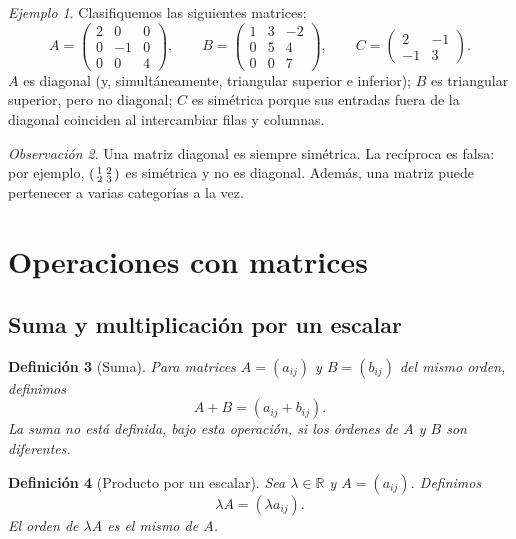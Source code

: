 \documentclass[12pt]{article}
\newtheorem{definicion}{Definición}[section]
\theoremstyle{remark}
\newtheorem{observacion}[definicion]{Observación}
\newtheorem{ejemplo}[definicion]{Ejemplo}
\newcommand{\R}{\mathbb{R}}
\begin{document}
\begin{ejemplo}
Clasifiquemos las siguientes matrices:
\[
A=\begin{pmatrix}2&0&0\\0&-1&0\\0&0&4\end{pmatrix},\qquad
B=\begin{pmatrix}1&3&-2\\0&5&4\\0&0&7\end{pmatrix},\qquad
C=\begin{pmatrix}2&-1\\-1&3\end{pmatrix}.
\]
$A$ es diagonal (y, simultáneamente, triangular superior e inferior); $B$ es triangular superior, pero no diagonal; $C$ es simétrica porque sus entradas fuera de la diagonal coinciden al intercambiar filas y columnas.
\end{ejemplo}

\begin{observacion}
Una matriz diagonal es siempre simétrica. La recíproca es falsa: por ejemplo, $\begin{psmallmatrix}1&2\\2&3\end{psmallmatrix}$ es simétrica y no es diagonal. Además, una matriz puede pertenecer a varias categorías a la vez.
\end{observacion}

\section{Operaciones con matrices}
\subsection{Suma y multiplicación por un escalar}
\begin{definicion}[Suma]
Para matrices $A=(a_{ij})$ y $B=(b_{ij})$ del \emph{mismo orden}, definimos
\[
A+B=(a_{ij}+b_{ij}).
\]
La suma no está definida, bajo esta operación, si los órdenes de $A$ y $B$ son diferentes.
\end{definicion}

\begin{definicion}[Producto por un escalar]
Sea $\lambda\in\R$ y $A=(a_{ij})$. Definimos
\[
\lambda A=(\lambda a_{ij}).
\]
El orden de $\lambda A$ es el mismo de $A$.
\end{definicion}
\end{document}
